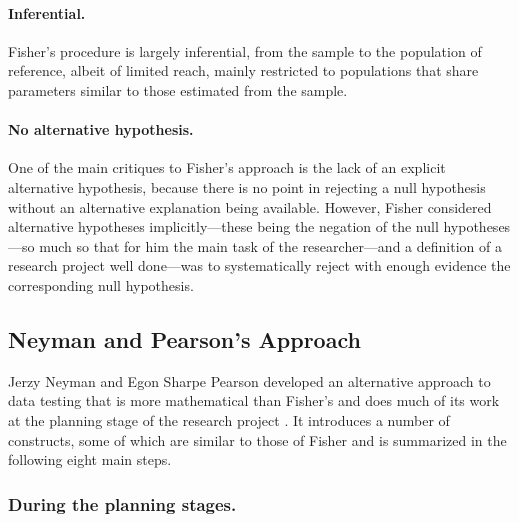\documentclass[
]{book}
\theoremstyle{definition}
\theoremstyle{definition}
\theoremstyle{definition}
\theoremstyle{definition}
\theoremstyle{remark}
\begin{document}
\hypertarget{inferential.}{%
\paragraph*{Inferential.}\label{inferential.}}

Fisher's procedure is largely inferential, from the sample to the population of reference, albeit of limited reach, mainly restricted to populations that share parameters similar to those estimated from the sample.

\hypertarget{no-alternative-hypothesis.}{%
\paragraph*{No alternative hypothesis.}\label{no-alternative-hypothesis.}}

One of the main critiques to Fisher's approach is the lack of an explicit alternative hypothesis, because there is no point in rejecting a null hypothesis without an alternative explanation being available. However, Fisher considered alternative hypotheses implicitly---these being the negation of the null hypotheses---so much so that for him the main task of the researcher---and a definition of a research project well done---was to systematically reject with enough evidence the corresponding null hypothesis.

\hypertarget{neyman-and-pearsons-approach}{%
\subsection{Neyman and Pearson's Approach}\label{neyman-and-pearsons-approach}}

Jerzy Neyman and Egon Sharpe Pearson developed an alternative approach to data testing that is more mathematical than Fisher's and does much of its work at the planning stage of the research project \citep{Macdonald1997}. It introduces a number of constructs, some of which are similar to those of Fisher and is summarized in the following eight main steps.

\hypertarget{during-the-planning-stages.}{%
\subsubsection*{During the planning stages.}\label{during-the-planning-stages.}}
\end{document}
